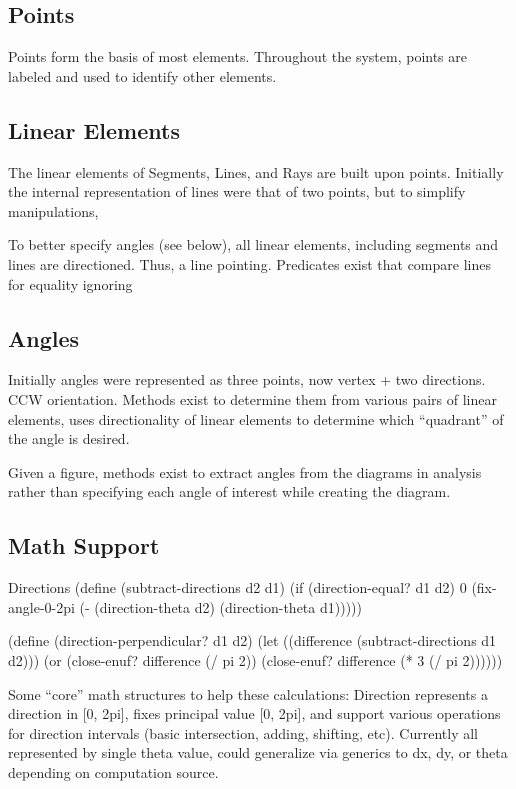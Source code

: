 \subsection{Points}

Points form the basis of most elements. Throughout the system, points
are labeled and used to identify other elements.

\subsection{Linear Elements}

The linear elements of Segments, Lines, and Rays are built upon
points. Initially the internal representation of lines were that of
two points, but to simplify manipulations,

To better specify angles (see below), all linear elements, including
segments and lines are directioned. Thus, a line pointing. Predicates
exist that compare lines for equality ignoring

\subsection{Angles}

Initially angles were represented as three points, now vertex + two
directions. CCW orientation. Methods exist to determine them from
various pairs of linear elements, uses directionality of linear
elements to determine which ``quadrant'' of the angle is desired.

Given a figure, methods exist to extract angles from the diagrams in
analysis rather than specifying each angle of interest while creating
the diagram.

\subsection{Math Support}

\begin{code-listing}{Directions}
(define (subtract-directions d2 d1)
  (if (direction-equal? d1 d2)
      0
      (fix-angle-0-2pi (- (direction-theta d2)
                          (direction-theta d1)))))

(define (direction-perpendicular? d1 d2)
  (let ((difference (subtract-directions d1 d2)))
    (or (close-enuf? difference (/ pi 2))
        (close-enuf? difference (* 3 (/ pi 2))))))
\end{code-listing}

Some ``core'' math structures to help these calculations: Direction
represents a direction in [0, 2pi], fixes principal value [0, 2pi],
and support various operations for direction intervals (basic
intersection, adding, shifting, etc). Currently all represented by
single theta value, could generalize via generics to dx, dy, or theta
depending on computation source.

